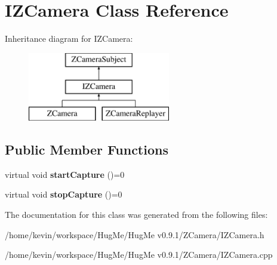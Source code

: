 \hypertarget{classIZCamera}{
\section{IZCamera Class Reference}
\label{classIZCamera}
}
Inheritance diagram for IZCamera:\begin{figure}[H]
\begin{center}
\leavevmode
\includegraphics[height=3cm]{classIZCamera}
\end{center}
\end{figure}
\subsection*{Public Member Functions}
\begin{DoxyCompactItemize}
\item 
\hypertarget{classIZCamera_a6d9b10985172343983a9edbdb324c367}{
virtual void {\bfseries startCapture} ()=0}
\label{classIZCamera_a6d9b10985172343983a9edbdb324c367}

\item 
\hypertarget{classIZCamera_ac1a752c869fc2c97b0f7feff6163068f}{
virtual void {\bfseries stopCapture} ()=0}
\label{classIZCamera_ac1a752c869fc2c97b0f7feff6163068f}

\end{DoxyCompactItemize}


The documentation for this class was generated from the following files:\begin{DoxyCompactItemize}
\item 
/home/kevin/workspace/HugMe/HugMe v0.9.1/ZCamera/IZCamera.h\item 
/home/kevin/workspace/HugMe/HugMe v0.9.1/ZCamera/IZCamera.cpp\end{DoxyCompactItemize}
